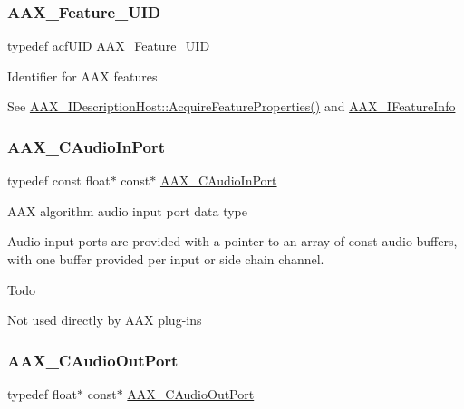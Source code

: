 \subsubsection{\texorpdfstring{AAX\_Feature\_UID}{AAX\_Feature\_UID}}
{\footnotesize\ttfamily typedef \mbox{\hyperlink{a00269_ab19414382287ff80930c48a196145214}{acf\+U\+ID}} \mbox{\hyperlink{a00392_a53d6cf8a08224b3e813333e411ce798e}{A\+A\+X\+\_\+\+Feature\+\_\+\+U\+ID}}}

Identifier for A\+AX features

See \mbox{\hyperlink{a01793_aa0d9e27d0207113f98c217d870bfa5e9}{A\+A\+X\+\_\+\+I\+Description\+Host\+::\+Acquire\+Feature\+Properties()}} and \mbox{\hyperlink{a01829}{A\+A\+X\+\_\+\+I\+Feature\+Info}} \mbox{\label{a00392_a901605fce9f6c52b770f95916a5db4cf}} 
\subsubsection{\texorpdfstring{AAX\_CAudioInPort}{AAX\_CAudioInPort}}
{\footnotesize\ttfamily typedef const float$\ast$ const$\ast$ \mbox{\hyperlink{a00392_a901605fce9f6c52b770f95916a5db4cf}{A\+A\+X\+\_\+\+C\+Audio\+In\+Port}}}



A\+AX algorithm audio input port data type 

Audio input ports are provided with a pointer to an array of const audio buffers, with one buffer provided per input or side chain channel.

\begin{DoxyRefDesc}{Todo}
\item[\mbox{\hyperlink{a00785__todo000009}{Todo}}]Not used directly by A\+AX plug-\/ins \end{DoxyRefDesc}
\mbox{\label{a00392_a650727644637144afc13344e7996c947}} 
\subsubsection{\texorpdfstring{AAX\_CAudioOutPort}{AAX\_CAudioOutPort}}
{\footnotesize\ttfamily typedef float$\ast$ const$\ast$ \mbox{\hyperlink{a00392_a650727644637144afc13344e7996c947}{A\+A\+X\+\_\+\+C\+Audio\+Out\+Port}}}



